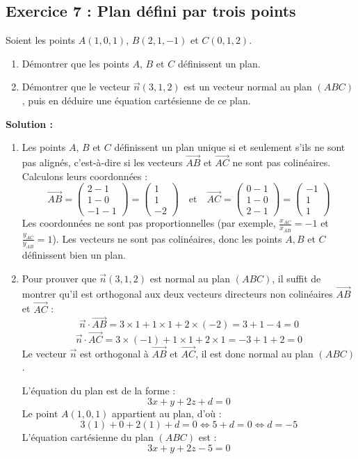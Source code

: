 \subsection*{Exercice 7 : Plan défini par trois points}
Soient les points $A(1, 0, 1)$, $B(2, 1, -1)$ et $C(0, 1, 2)$.
\begin{enumerate}
    \item Démontrer que les points $A$, $B$ et $C$ définissent un plan.
    \item Démontrer que le vecteur $\vec{n}(3, 1, 2)$ est un vecteur normal au plan $(ABC)$, puis en déduire une équation cartésienne de ce plan.
\end{enumerate}

\textbf{Solution :}
\begin{enumerate}
    \item Les points $A$, $B$ et $C$ définissent un plan unique si et seulement s'ils ne sont pas alignés, c'est-à-dire si les vecteurs $\vec{AB}$ et $\vec{AC}$ ne sont pas colinéaires.
    Calculons leurs coordonnées :
    \[
    \vec{AB} = \begin{pmatrix} 2-1 \\ 1-0 \\ -1-1 \end{pmatrix} = \begin{pmatrix} 1 \\ 1 \\ -2 \end{pmatrix} \quad \text{et} \quad \vec{AC} = \begin{pmatrix} 0-1 \\ 1-0 \\ 2-1 \end{pmatrix} = \begin{pmatrix} -1 \\ 1 \\ 1 \end{pmatrix}
    \]
    Les coordonnées ne sont pas proportionnelles (par exemple, $\frac{x_{AC}}{x_{AB}} = -1$ et $\frac{y_{AC}}{y_{AB}} = 1$). Les vecteurs ne sont pas colinéaires, donc les points $A, B$ et $C$ définissent bien un plan.
    
    \item Pour prouver que $\vec{n}(3, 1, 2)$ est normal au plan $(ABC)$, il suffit de montrer qu'il est orthogonal aux deux vecteurs directeurs non colinéaires $\vec{AB}$ et $\vec{AC}$ :
    \[
    \vec{n} \cdot \vec{AB} = 3 \times 1 + 1 \times 1 + 2 \times (-2) = 3 + 1 - 4 = 0
    \]
    \[
    \vec{n} \cdot \vec{AC} = 3 \times (-1) + 1 \times 1 + 2 \times 1 = -3 + 1 + 2 = 0
    \]
    Le vecteur $\vec{n}$ est orthogonal à $\vec{AB}$ et $\vec{AC}$, il est donc normal au plan $(ABC)$.
    
    L'équation du plan est de la forme :
    \[
    3x + y + 2z + d = 0
    \]
    Le point $A(1, 0, 1)$ appartient au plan, d'où :
    \[
    3(1) + 0 + 2(1) + d = 0 \iff 5 + d = 0 \iff d = -5
    \]
    L'équation cartésienne du plan $(ABC)$ est :
    \[
    3x + y + 2z - 5 = 0
    \]
\end{enumerate}

